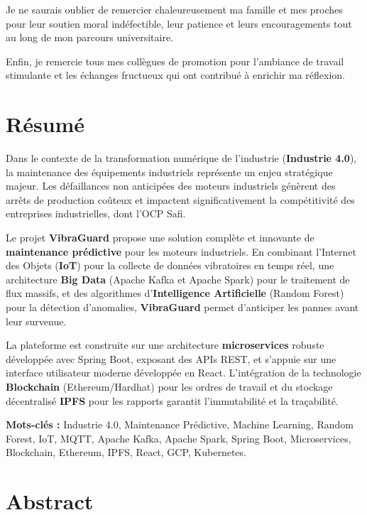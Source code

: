 \documentclass[12pt, a4paper, oneside]{report}
\newcommand{\projectname}{\textbf{VibraGuard}}
\newcommand{\kw}[1]{\textbf{#1}}
\begin{document}
Je ne saurais oublier de remercier chaleureusement ma famille et mes proches pour leur
soutien moral indéfectible, leur patience et leurs encouragements tout au long de mon
parcours universitaire.

Enfin, je remercie tous mes collègues de promotion pour l'ambiance de travail stimulante
et les échanges fructueux qui ont contribué à enrichir ma réflexion.

\newpage

\chapter*{Résumé}

Dans le contexte de la transformation numérique de l'industrie (\textbf{Industrie 4.0}), la
maintenance des équipements industriels représente un enjeu stratégique majeur. Les
défaillances non anticipées des moteurs industriels génèrent des arrêts de production coûteux
et impactent significativement la compétitivité des entreprises industrielles, dont l'OCP Safi.

Le projet \projectname{} propose une solution complète et innovante de \kw{maintenance
prédictive} pour les moteurs industriels. En combinant l'Internet des Objets (\kw{IoT}) pour
la collecte de données vibratoires en temps réel, une architecture \kw{Big Data} (Apache Kafka
et Apache Spark) pour le traitement de flux massifs, et des algorithmes d'\kw{Intelligence
Artificielle} (Random Forest) pour la détection d'anomalies, \projectname{}
permet d'anticiper les pannes avant leur survenue.

La plateforme est construite sur une architecture \kw{microservices} robuste développée avec Spring Boot, exposant des APIs REST, et s'appuie sur une interface utilisateur moderne développée en React. L'intégration de la technologie \kw{Blockchain} (Ethereum/Hardhat) pour les ordres de travail et du stockage décentralisé \kw{IPFS} pour les rapports garantit l'immutabilité et la traçabilité.

\vspace{0.5em}
\noindent\textbf{Mots-clés :} Industrie 4.0, Maintenance Prédictive, Machine Learning, Random
Forest, IoT, MQTT, Apache Kafka, Apache Spark, Spring Boot, Microservices, Blockchain,
Ethereum, IPFS, React, GCP, Kubernetes.

\newpage


\chapter*{Abstract}
\end{document}
